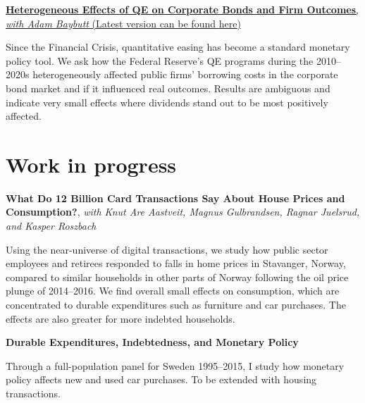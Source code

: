\documentclass{clean_CV}
\newcommand{\datetabspace}{4.5em}
\begin{document}
\medskip

\href{http://www.adambaybutt.org/uploads/1/2/4/9/124972193/baybutt_bojeryd-2021-qe_and_firms.pdf}{\textbf{Heterogeneous Effects of QE on Corporate Bonds and Firm Outcomes}, \emph{with Adam Baybutt} (\href{http://www.adambaybutt.org/uploads/1/2/4/9/124972193/baybutt_bojeryd-2021-qe_and_firms.pdf}{Latest version can be found \underline{here}})}

Since the Financial Crisis, quantitative easing has become a standard monetary policy tool. We ask how the Federal Reserve's QE programs during the 2010--2020s heterogeneously affected public firms' borrowing costs in the corporate bond market and if it influenced real outcomes. Results are ambiguous and indicate very small effects where dividends stand out to be most positively affected.


\section{Work in progress}




\textbf{What Do 12 Billion Card Transactions Say About House Prices and Consumption?}, \emph{with Knut Are Aastveit, Magnus Gulbrandsen, Ragnar Juelsrud, and Kasper Roszbach}

Using the near-universe of digital transactions, we study how public sector employees and retirees responded to falls in home prices in Stavanger, Norway, compared to similar households in other parts of Norway following the oil price plunge of 2014--2016. We find overall small effects on consumption, which are concentrated to durable expenditures such as furniture and car purchases. The effects are also greater for more indebted households.

\medskip

\textbf{Durable Expenditures, Indebtedness, and Monetary Policy}

Through a full-population panel for Sweden 1995--2015, I study how monetary policy affects new and used car purchases. To be extended with housing transactions.

\iffalse
\section{Research papers}
\nocite{*}%
\highlightauthorname{Jesper}{J}{Bojeryd} 
\begin{datetabular}{\datetabspace}
\dateentry{2021}{\printbibyear{2021}}
\dateentry{2015}{\printbibyear{2015}}
\end{datetabular}
\fi
\end{document}
